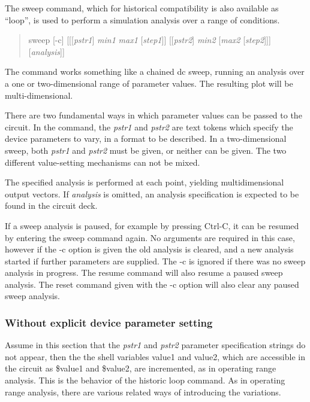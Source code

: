 
The {\cb sweep} command, which for historical compatibility is also
available as ``{\cb loop}'', is used to perform a simulation analysis
over a range of conditions.

\begin{quote}\vt
sweep [-c] [[[{\it pstr1\/}] {\it min1} {\it max1\/} [{\it step1\/}]]
 [[{\it pstr2\/}] {\it min2\/} [{\it max2\/} [{\it step2\/}]]]
 [{\it analysis\/}]]
\end{quote}
The command works something like a chained dc sweep, running an
analysis over a one or two-dimensional range of parameter values.  The
resulting plot will be multi-dimensional.

There are two fundamental ways in which parameter values can be passed
to the circuit.  In the command, the {\it pstr1} and {\it pstr2} are
text tokens which specify the device parameters to vary, in a format
to be described.  In a two-dimensional sweep, both {\it pstr1} and
{\it pstr2} must be given, or neither can be given.  The two different
value-setting mechanisms can not be mixed.

The specified analysis is performed at each point, yielding
multidimensional output vectors.  If {\it analysis} is omitted, an
analysis specification is expected to be found in the circuit deck.

If a sweep analysis is paused, for example by pressing {\kb Ctrl-C},
it can be resumed by entering the {\cb sweep} command again.  No
arguments are required in this case, however if the {\vt -c} option is
given the old analysis is cleared, and a new analysis started if
further parameters are supplied.  The {\vt -c} is ignored if there was
no sweep analysis in progress.  The {\cb resume} command will also
resume a paused sweep analysis.  The {\cb reset} command given with
the {\vt -c} option will also clear any paused sweep analysis.

\subsubsection{Without explicit device parameter setting}

Assume in this section that the {\it pstr1} and {\it pstr2} parameter
specification strings do not appear, then the the shell variables {\vt
value1} and {\vt value2}, which are accessible in the circuit as {\vt
\$value1} and {\vt \$value2}, are incremented, as in operating range
analysis.  This is the behavior of the historic {\cb loop} command. 
As in operating range analysis, there are various related ways of
introducing the variations.

